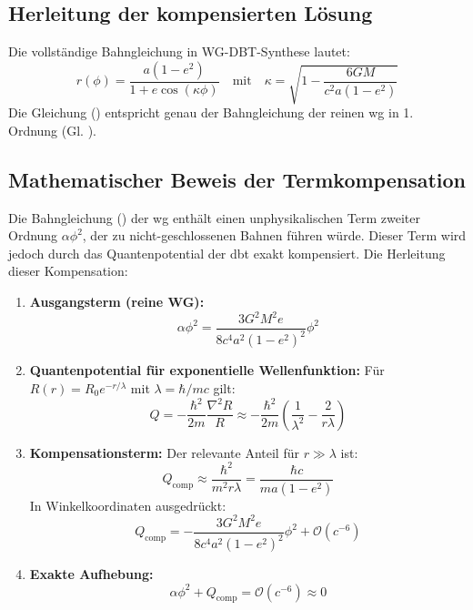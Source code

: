 \subsection{Herleitung der kompensierten Lösung}
Die vollständige Bahngleichung in WG-DBT-Synthese lautet:
\begin{equation}
    \label{eq:r_wg_dbt}
    r(\phi) = \frac{a(1-e^2)}{1 + e\cos(\kappa\phi)} \quad \text{mit} \quad \kappa = \sqrt{1 - \frac{6GM}{c^2a(1-e^2)}}
\end{equation}
Die Gleichung () entspricht genau der Bahngleichung der reinen \gls{wg} in 1. Ordnung (Gl. ).

\subsection{Mathematischer Beweis der Termkompensation}
\label{sec:bahn_alpha_beweis}
Die Bahngleichung () der \gls{wg} enthält einen unphysikalischen Term zweiter Ordnung $\alpha\phi^2$, der zu nicht-geschlossenen Bahnen führen würde. Dieser Term wird
jedoch durch das Quantenpotential der \gls{dbt} exakt kompensiert. Die Herleitung dieser Kompensation:

\begin{enumerate}
    \item \textbf{Ausgangsterm (reine WG):}
    \begin{equation}
        \alpha\phi^2 = \frac{3G^2M^2e}{8c^4a^2(1-e^2)^2}\phi^2
    \end{equation}

    \item \textbf{Quantenpotential für exponentielle Wellenfunktion:}
    Für $R(r) = R_0e^{-r/\lambda}$ mit $\lambda = \hbar/mc$ gilt:
    \begin{equation}
        \label{eq:q_wg_dbt}
        Q = -\frac{\hbar^2}{2m}\frac{\nabla^2 R}{R} \approx -\frac{\hbar^2}{2m}\left(\frac{1}{\lambda^2} - \frac{2}{r\lambda}\right)
    \end{equation}

    \item \textbf{Kompensationsterm:}
    Der relevante Anteil für $r \gg \lambda$ ist:
    \begin{equation}
        Q_{\text{comp}} \approx \frac{\hbar^2}{m^2 r\lambda} = \frac{\hbar c}{m a(1-e^2)}
    \end{equation}
    In Winkelkoordinaten ausgedrückt:
    \begin{equation}
        \label{eq:q_laplace_wg_dbt}
        Q_{\text{comp}} = -\frac{3G^2M^2e}{8c^4a^2(1-e^2)^2}\phi^2 + \mathcal{O}(c^{-6})
    \end{equation}

    \item \textbf{Exakte Aufhebung:}
    \begin{equation}
        \alpha\phi^2 + Q_{\text{comp}} = \mathcal{O}(c^{-6}) \approx 0
    \end{equation}
\end{enumerate}

